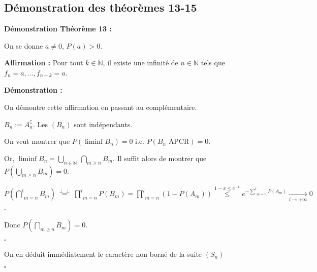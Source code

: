 \documentclass[10pt,a4paper,notitlepage ]{report}
\newcommand{\N}{\mathbb N}
\newcommand{\1}{\mathds 1}
\newcommand{\comp}[1]{#1^\complement}
\newcommand{\indep}{\perp \!\!\! \perp}
\newcounter{th}
\newenvironment{demo}[1][]{

	\textbf{Démonstration #1 :}
}{\begin{flushright}
	$\square$
\end{flushright}
}
\begin{document}
\subsection{Démonstration des théorèmes 13-15}

\begin{demo}[Théorème 13]
	On se donne $a\ne 0$, $P(a) > 0$.
	 
	\textbf{\quad Affirmation :} Pour tout $k\in\N$, il existe une infinité de $n\in\N$ tels que $f_n = a, \dots, f_{n+k} = a$.
	\begin{demo}
		On démontre cette affirmation en passant au complémentaire.
		
		$B_n := \comp{A_n}$. Les $(B_n)$ sont indépendants.
		
		On veut montrer que $P(\liminf B_n) = 0$ i.e. $P(B_n \text{ APCR}) = 0$.
		
		Or, $\liminf B_n = \underset {n\in\N} \bigcup \  \underset{m\ge n}\bigcap B_m$. Il suffit alors de montrer que $P(\underset{m\ge n}\bigcup B_m) = 0$.
		
		$P(\underset{m=n}{\overset l \bigcap} B_m) \overset{\indep} = \underset{m=n} {\overset l \prod} P(B_m) = \underset{m=n}{\overset l \prod}(1-P(A_m)) \overset{1-x \le e^{-x}} \le e^{-\underset{m=n}{\overset l \sum} P(A_m)} \underset{l\rightarrow +\infty} \longrightarrow 0$.
		
		Donc $P(\underset{m\ge n} \bigcap B_m) = 0$.
	\end{demo}
	
	On en déduit immédiatement le caractère non borné de la suite $(S_n)$
\end{demo}
\end{document}

